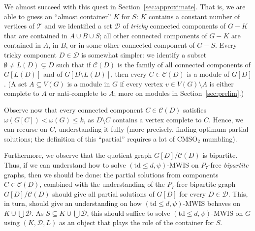 \documentclass[11pt,a4paper]{article}
\theoremstyle{definition}
\def\T{\mathcal{T}}
\newcommand{\CMSO}{\textsf{CMSO}$_2$\xspace}
\begin{document}
We almost succeed with this quest in Section~\ref{sec:approximate}. 
That is, we are able to guess an ``almost container'' $K$ for $S$: 
$K$ contains a constant number of vertices of $\T$
and we identified a set $\mathcal{D}$ of \emph{tricky} connected components of $G-K$
that are contained in $A \cup B \cup S$; all other connected components
of $G-K$ are contained in $A$, in $B$, or in some other connected component of $G-S$.
Every tricky component $D \in \mathcal{D}$ is somewhat simpler: 
we identify a subset $\emptyset \neq L(D) \subsetneq D$ such that 
if $\mathcal{C}(D)$ is the family of all connected components of
 $G[L(D)]$ and of $G[D \setminus L(D)]$,
 then every $C \in \mathcal{C}(D)$ is a module of $G[D]$. 
 (A set $A \subseteq V(G)$ is a module in $G$ if every vertex $v \in V(G) \setminus A$
 is either complete to $A$ or anti-complete to $A$; more on modules in Section~\ref{sec:prelim}.)

Observe now that every connected component $C \in \mathcal{C}(D)$
satisfies $\omega(G[C]) < \omega(G) \leq k$, as $D \setminus C$ contains a vertex
complete to $C$. Hence, we can recurse on $C$, understanding it fully
(more precisely, finding optimum partial solutions; the definition
 of this ``partial'' requires a lot of \CMSO mumbling). 

Furthermore, we observe that the quotient graph $G[D]/\mathcal{C}(D)$ is bipartite.
Thus, if we can understand how to solve $(\mathrm{td} \leq d, \psi)$-\textsc{MWIS}
on $P_7$-free \emph{bipartite} graphs, then we should be done: the partial
solutions from components $C \in \mathcal{C}(D)$, combined with the understanding
of the $P_7$-free bipartite graph $G[D]/\mathcal{C}(D)$ should give
all partial solutions of $G[D]$ for every $D \in \mathcal{D}$. 
This, in turn, should give an understanding on how $(\mathrm{td} \leq d,\psi)$-\textsc{MWIS}
behaves on $K \cup \bigcup \mathcal{D}$.
As $S \subseteq K \cup \bigcup \mathcal{D}$, this should suffice to solve
$(\mathrm{td} \leq d,\psi)$-\textsc{MWIS} on $G$ using $(K,\mathcal{D},L)$ as 
an object that plays the role of the container for $S$. 
\end{document}
